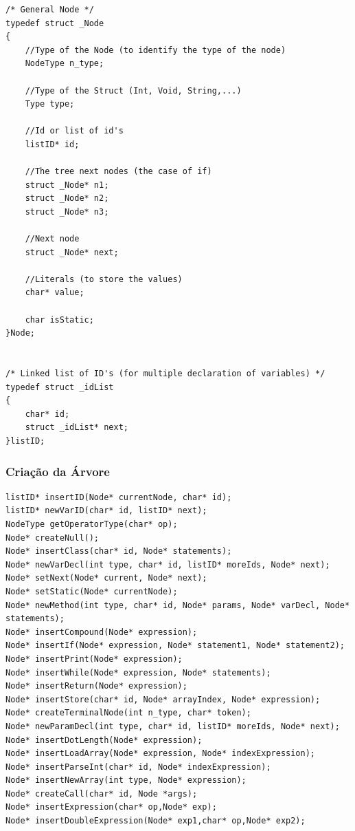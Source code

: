 \documentclass[12pt]{article}
\begin{document}
\begin{lstlisting}
/* General Node */
typedef struct _Node
{
    //Type of the Node (to identify the type of the node)
	NodeType n_type;

    //Type of the Struct (Int, Void, String,...)
	Type type;

    //Id or list of id's
    listID* id;

    //The tree next nodes (the case of if)
    struct _Node* n1;
    struct _Node* n2;
    struct _Node* n3;

    //Next node
    struct _Node* next;

    //Literals (to store the values)
    char* value;

    char isStatic;
}Node;


/* Linked list of ID's (for multiple declaration of variables) */
typedef struct _idList
{
	char* id;
	struct _idList* next;
}listID;

\end{lstlisting}
 
 \subsubsection{Criação da Árvore}
\begin{lstlisting}
listID* insertID(Node* currentNode, char* id);
listID* newVarID(char* id, listID* next);
NodeType getOperatorType(char* op);
Node* createNull();
Node* insertClass(char* id, Node* statements);
Node* newVarDecl(int type, char* id, listID* moreIds, Node* next);
Node* setNext(Node* current, Node* next);
Node* setStatic(Node* currentNode);
Node* newMethod(int type, char* id, Node* params, Node* varDecl, Node* statements);
Node* insertCompound(Node* expression);
Node* insertIf(Node* expression, Node* statement1, Node* statement2);
Node* insertPrint(Node* expression);
Node* insertWhile(Node* expression, Node* statements);
Node* insertReturn(Node* expression);
Node* insertStore(char* id, Node* arrayIndex, Node* expression);
Node* createTerminalNode(int n_type, char* token);
Node* newParamDecl(int type, char* id, listID* moreIds, Node* next);
Node* insertDotLength(Node* expression);
Node* insertLoadArray(Node* expression, Node* indexExpression);
Node* insertParseInt(char* id, Node* indexExpression);
Node* insertNewArray(int type, Node* expression);
Node* createCall(char* id, Node *args);
Node* insertExpression(char* op,Node* exp);
Node* insertDoubleExpression(Node* exp1,char* op,Node* exp2);
 \end{lstlisting}
\end{document}
